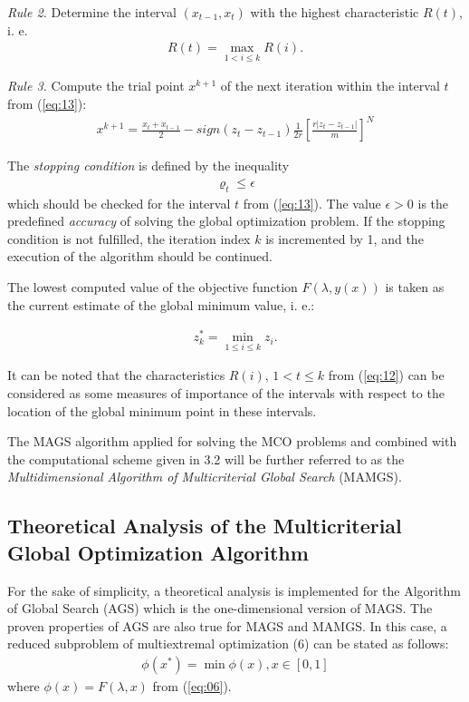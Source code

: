 \documentclass[smallcondensed]{svjour3}     %
\begin{document}
{\it Rule 2.} Determine the interval $(x_{t-1}, x_t)$ with the highest characteristic $R(t)$, i. e.
\begin{eqnarray} \label{eq:13}
R(t) = \max_{1 < i \leq k} {R(i)}. 
\end{eqnarray}

{\it Rule 3.} Compute the trial point $x^{k+1}$ of the next iteration within the interval $t$ from (\ref{eq:13}):
\begin{eqnarray*}
x^{k+1} = \frac{x_t + x_{t-1}}{2} - sign(z_t - z_{t-1})\frac{1}{2r} \left[\frac{r|z_t - z_{t-1}|}{m} \right]^N
\end{eqnarray*}

The {\it stopping condition} is defined by the inequality
\begin{eqnarray} \label{eq:14}
\varrho_t \leq \epsilon 
\end{eqnarray}
which should be checked for the interval $t$ from (\ref{eq:13}). The value $\epsilon > 0$ is the predefined {\it accuracy} of solving the global optimization problem. If the stopping condition is not fulfilled, the iteration index $k$ is incremented by 1, and the execution of the algorithm should be continued. \par

The lowest computed value of the objective function $F(\lambda,y(x))$ is taken as the current estimate of the global minimum value, i. e.:

\begin{eqnarray} \label{eq:15}
z_k^* = \min_{1 \leq i \leq k} {z_i}.
\end{eqnarray}

It can be noted that the characteristics $R(i)$, $1 < t \leq k$ from (\ref{eq:12}) can be considered as some measures of importance of the intervals with respect to the location of the global minimum point in these intervals.\par
 
The MAGS algorithm applied for solving the MCO problems and combined with the computational scheme given in 3.2 will be further referred to as the {\it Multidimensional Algorithm of Multicriterial Global Search} (MAMGS).

\subsection{Theoretical Analysis of the Multicriterial Global Optimization Algorithm}
For the sake of simplicity, a theoretical analysis is implemented for the Algorithm of Global Search (AGS) which is the one-dimensional version of MAGS. The proven properties of AGS are also true for MAGS and MAMGS. In this case, a reduced subproblem of multiextremal optimization (6) can be stated as follows:
\begin{eqnarray} \label{eq:16}
\phi(x^*) = \min {\phi(x)}, x \in[0,1] 
\end{eqnarray}
where $\phi(x) = F(\lambda,x)$ from (\ref{eq:06}).\par
\end{document}
